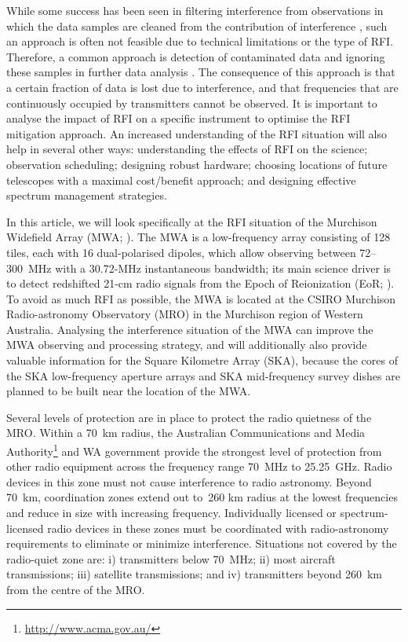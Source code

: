 \documentclass{pasa}
\begin{document}
While some success has been seen in filtering interference from observations in which the data samples are cleaned from the contribution of interference \citep{spatial-filtering-parkes-multibeam-for-pulses,rfi-spatial-processing-hellbourg-2014}, such an approach is often not feasible due to technical limitations or the type of RFI. Therefore, a common approach is detection of contaminated data and ignoring these samples in further data analysis \citep{statistical-rfi-removal,pieflag-middelberg,post-correlation-rfi-classification,prasad-flagcal-2012,serpent-peck-2013}. The consequence of this approach is that a certain fraction of data is lost due to interference, and that frequencies that are continuously occupied by transmitters cannot be observed. It is important to analyse the impact of RFI on a specific instrument to optimise the RFI mitigation approach. An increased understanding of the RFI situation will also help in several other ways: understanding the effects of RFI on the science; observation scheduling; designing robust hardware; choosing locations of future telescopes with a maximal cost/benefit approach; and designing effective spectrum management strategies.

In this article, we will look specifically at the RFI situation of the Murchison Widefield Array (MWA; \citealt{mwa-design-2009,mwa}). The MWA is a low-frequency array consisting of 128 tiles, each with 16 dual-polarised dipoles, which allow observing between 72--300~MHz with a 30.72-MHz instantaneous bandwidth; its main science driver is to detect redshifted 21-cm radio signals from the Epoch of Reionization (EoR; \citealt{bowman-science-with-the-mwa-2013}). To avoid as much RFI as possible, the MWA is located at the CSIRO Murchison Radio-astronomy Observatory (MRO) in the Murchison region of Western Australia. Analysing the interference situation of the MWA can improve the MWA observing and processing strategy, and will additionally also provide valuable information for the Square Kilometre Array (SKA), because the cores of the SKA low-frequency aperture arrays and SKA mid-frequency survey dishes are planned to be built near the location of the MWA.

Several levels of protection are in place to protect the radio quietness of the MRO. Within a 70~km radius, the Australian Communications and Media Authority\footnote{\url{http://www.acma.gov.au/}} and WA government provide the strongest level of protection from other radio equipment across the frequency range 70~MHz to 25.25~GHz. Radio devices in this zone must not cause interference to radio astronomy.  Beyond 70~km, coordination zones extend out to~260 km radius at the lowest frequencies and reduce in size with increasing frequency. Individually licensed or spectrum-licensed radio devices in these zones must be coordinated with radio-astronomy requirements to eliminate or minimize interference. Situations not covered by the radio-quiet zone are: i) transmitters below 70~MHz; ii) most aircraft transmissions; iii) satellite transmissions; and iv) transmitters beyond 260~km from the centre of the MRO.
\end{document}
